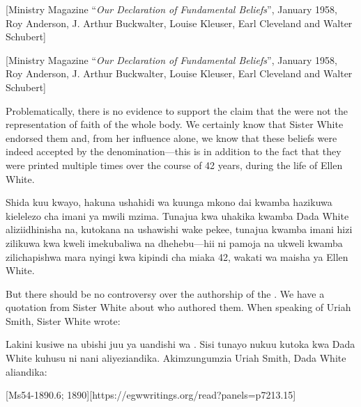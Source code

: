 [Ministry Magazine “\textit{Our Declaration of Fundamental Beliefs}”, January 1958, Roy Anderson, J. Arthur Buckwalter, Louise Kleuser, Earl Cleveland and Walter Schubert]


[Ministry Magazine “\textit{Our Declaration of Fundamental Beliefs}”, January 1958, Roy Anderson, J. Arthur Buckwalter, Louise Kleuser, Earl Cleveland and Walter Schubert]


Problematically, there is no evidence to support the claim that the  were not the representation of faith of the whole body. We certainly know that Sister White endorsed them and, from her influence alone, we know that these beliefs were indeed accepted by the denomination—this is in addition to the fact that they were printed multiple times over the course of 42 years, during the life of Ellen White.


Shida kuu kwayo, hakuna ushahidi wa kuunga mkono dai kwamba  hazikuwa kielelezo cha imani ya mwili mzima. Tunajua kwa uhakika kwamba Dada White aliziidhinisha na, kutokana na ushawishi wake pekee, tunajua kwamba imani hizi zilikuwa kwa kweli imekubaliwa na dhehebu—hii ni pamoja na ukweli kwamba zilichapishwa mara nyingi kwa kipindi cha miaka 42, wakati wa maisha ya Ellen White.


But there should be no controversy over the authorship of the . We have a quotation from Sister White about who authored them. When speaking of Uriah Smith, Sister White wrote:


Lakini kusiwe na ubishi juu ya uandishi wa . Sisi tunayo nukuu kutoka kwa Dada White kuhusu ni nani aliyeziandika. Akimzungumzia Uriah Smith, Dada White aliandika:


[Ms54-1890.6; 1890][https://egwwritings.org/read?panels=p7213.15]


